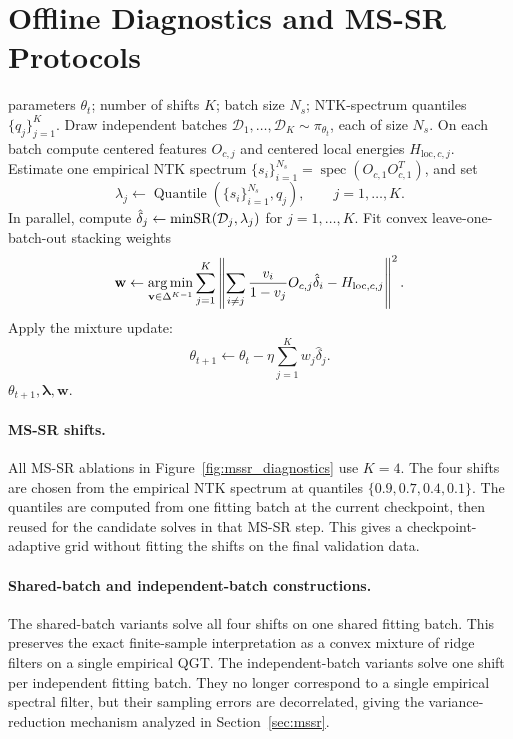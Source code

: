 \section{Offline Diagnostics and MS-SR Protocols}\label{app:mssr}

\begin{algorithm}[t]
\caption{Multi-Shift SR (MS-SR): one optimization step}
\label{alg:mssr_appendix}
\begin{algorithmic}[1]
\Require parameters \(\theta_t\); number of shifts \(K\); batch size \(N_s\);
NTK-spectrum quantiles \(\{q_j\}_{j=1}^K\).
\State Draw independent batches
\(\mathcal D_1,\dots,\mathcal D_K\sim\pi_{\theta_t}\), each of size \(N_s\).
On each batch compute centered features \(O_{c,j}\) and centered local energies
\(H_{\mathrm{loc},c,j}\).
\State Estimate one empirical NTK spectrum
\(\{s_i\}_{i=1}^{N_s}=\operatorname{spec}(O_{c,1}O_{c,1}^T)\), and set
\[
    \lambda_j
    \leftarrow
    \operatorname{Quantile}(\{s_i\}_{i=1}^{N_s},q_j),
    \qquad j=1,\dots,K .
\]
\State In parallel, compute
\(\hat\delta_j\leftarrow\operatorname{minSR}(\mathcal D_j,\lambda_j)\) for
\(j=1,\dots,K\).
\State Fit convex leave-one-batch-out stacking weights
\[
    \mathbf w
    \leftarrow
    \operatorname*{arg\,min}_{\mathbf v\in\Delta^{K-1}}
    \sum_{j=1}^K
    \left\|
        \sum_{i\ne j}\frac{v_i}{1-v_j}O_{c,j}\hat\delta_i
        -
        H_{\mathrm{loc},c,j}
    \right\|^2 .
\]
\State Apply the mixture update:
\[
    \theta_{t+1}
    \leftarrow
    \theta_t-\eta\sum_{j=1}^K w_j\hat\delta_j .
\]
\State \Return \(\theta_{t+1},\boldsymbol{\lambda},\mathbf w\).
\end{algorithmic}
\end{algorithm}

\paragraph{MS-SR shifts.}
All MS-SR ablations in Figure~\ref{fig:mssr_diagnostics} use $K=4$. The four
shifts are chosen from the empirical NTK spectrum at quantiles
\(\{0.9,0.7,0.4,0.1\}\). The quantiles are computed from one fitting batch at
the current checkpoint, then reused for the candidate solves in that MS-SR step.
This gives a checkpoint-adaptive grid without fitting the shifts on the final
validation data.

\paragraph{Shared-batch and independent-batch constructions.}
The shared-batch variants solve all four shifts on one shared fitting batch. This
preserves the exact finite-sample interpretation as a convex mixture of ridge
filters on a single empirical QGT. The independent-batch variants solve one
shift per independent fitting batch. They no longer correspond to a single
empirical spectral filter, but their sampling errors are decorrelated, giving
the variance-reduction mechanism analyzed in Section~\ref{sec:mssr}.

